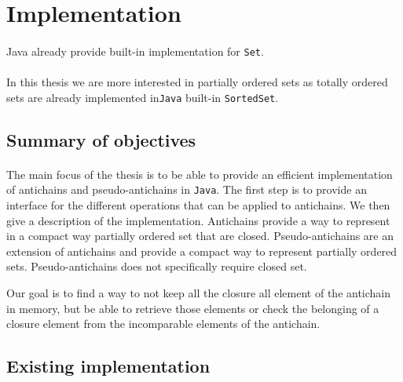 \documentclass[letterpaper]{article}
\theoremstyle{definition}
\begin{document}
\newpage

\section{Implementation}

\paragraph{}

Java already provide built-in implementation for \texttt{Set}.

\paragraph{}

In this thesis we are more interested in partially ordered sets as
totally ordered sets are already implemented
in\texttt{Java} built-in
\texttt{SortedSet}.

\subsection{Summary of objectives}


\paragraph{}


The main focus of the thesis is to be able to provide an efficient
implementation of antichains and pseudo-antichains in \texttt{Java}.
The first step is to provide an interface for the different operations that
can be applied to antichains. We then give a description
of the implementation.
Antichains provide a way to represent
in a compact way partially ordered set that are closed. Pseudo-antichains
are an extension of antichains and provide a compact way to represent
partially ordered sets. Pseudo-antichains does not specifically require
closed set.

Our goal is to find a way to not keep all the closure all
element of the antichain in memory, but be able to retrieve those elements
or check the belonging of a closure element from the incomparable elements
of the antichain.

\subsection{Existing implementation}
\end{document}
